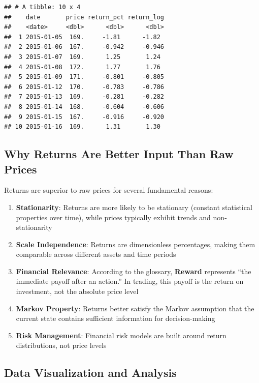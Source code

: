 \documentclass[
]{article}
\providecommand{\tightlist}{%
  \setlength{\itemsep}{0pt}\setlength{\parskip}{0pt}}
\begin{document}
\begin{verbatim}
## # A tibble: 10 x 4
##    date       price return_pct return_log
##    <date>     <dbl>      <dbl>      <dbl>
##  1 2015-01-05  169.     -1.81      -1.82 
##  2 2015-01-06  167.     -0.942     -0.946
##  3 2015-01-07  169.      1.25       1.24 
##  4 2015-01-08  172.      1.77       1.76 
##  5 2015-01-09  171.     -0.801     -0.805
##  6 2015-01-12  170.     -0.783     -0.786
##  7 2015-01-13  169.     -0.281     -0.282
##  8 2015-01-14  168.     -0.604     -0.606
##  9 2015-01-15  167.     -0.916     -0.920
## 10 2015-01-16  169.      1.31       1.30
\end{verbatim}

\hypertarget{why-returns-are-better-input-than-raw-prices}{%
\subsection{Why Returns Are Better Input Than Raw
Prices}\label{why-returns-are-better-input-than-raw-prices}}

Returns are superior to raw prices for several fundamental reasons:

\begin{enumerate}
\def\labelenumi{\arabic{enumi}.}
\tightlist
\item
  \textbf{Stationarity}: Returns are more likely to be stationary
  (constant statistical properties over time), while prices typically
  exhibit trends and non-stationarity
\item
  \textbf{Scale Independence}: Returns are dimensionless percentages,
  making them comparable across different assets and time periods
\item
  \textbf{Financial Relevance}: According to the glossary,
  \textbf{Reward} represents ``the immediate payoff after an action.''
  In trading, this payoff is the return on investment, not the absolute
  price level
\item
  \textbf{Markov Property}: Returns better satisfy the Markov assumption
  that the current state contains sufficient information for
  decision-making
\item
  \textbf{Risk Management}: Financial risk models are built around
  return distributions, not price levels
\end{enumerate}

\hypertarget{data-visualization-and-analysis}{%
\subsection{Data Visualization and
Analysis}\label{data-visualization-and-analysis}}
\end{document}
